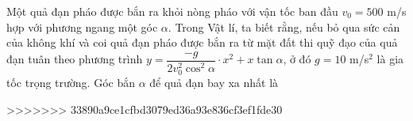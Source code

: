\begin{ex}%
	Một quả đạn pháo được bắn ra khỏi nòng pháo với vận tốc ban đầu $ v_0=500$ m/s hợp với phương ngang một góc $ \alpha $. Trong Vật lí, ta biết rằng, nếu bỏ qua sức cản của không khí và coi quả đạn pháo được bắn ra từ mặt đất thi quỹ đạo của quả đạn tuân theo phương trình $ y=\dfrac{-g}{2v_0^2\cos^2\alpha}\cdot x^2+x\tan \alpha $, ở đó $g = 10$ m/s$ ^2 $ là gia tốc trọng trường. Góc bắn $ \alpha $ để quả đạn bay xa nhất là
\end{ex}


>>>>>>> 33890a9ce1cfbd3079ed36a93e836cf3ef1fde30
